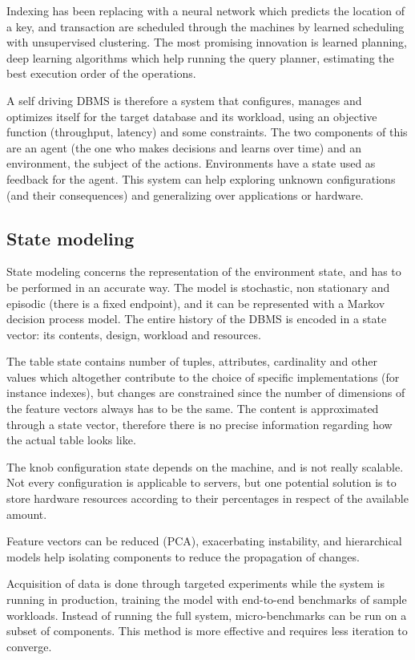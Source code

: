 Indexing has been replacing with a neural network which predicts the location of a key, and transaction are scheduled through the machines by learned scheduling with unsupervised clustering. The most promising innovation is learned planning, deep learning algorithms which help running the query planner, estimating the best execution order of the operations. 

A self driving DBMS is therefore a system that configures, manages and optimizes itself for the target database and its workload, using an objective function (throughput, latency) and some constraints. The two components of this are an agent (the one who makes decisions and learns over time) and an environment, the subject of the actions. Environments have a state used as feedback for the agent. This system can help exploring unknown configurations (and their consequences) and generalizing over applications or hardware.

\subsection{State modeling}
State modeling concerns the representation of the environment state, and has to be performed in an accurate way. The model is stochastic, non stationary and episodic (there is a fixed endpoint), and it can be represented with a Markov decision process model. The entire history of the DBMS is encoded in a state vector: its contents, design, workload and resources.

The table state contains number of tuples, attributes, cardinality and other values which altogether contribute to the choice of specific implementations (for instance indexes), but changes are constrained since the number of dimensions of the feature vectors always has to be the same. The content is approximated through a state vector, therefore there is no precise information regarding how the actual table looks like. 

The knob configuration state depends on the machine, and is not really scalable. Not every configuration is applicable to servers, but one potential solution is to store hardware resources according to their percentages in respect of the available amount. 

Feature vectors can be reduced (PCA), exacerbating instability, and hierarchical models help isolating components to reduce the propagation of changes. 

Acquisition of data is done through targeted experiments while the system is running in production, training the model with end-to-end benchmarks of sample workloads. Instead of running the full system, micro-benchmarks can be run on a subset of components. This method is more effective and requires less iteration to converge. 

